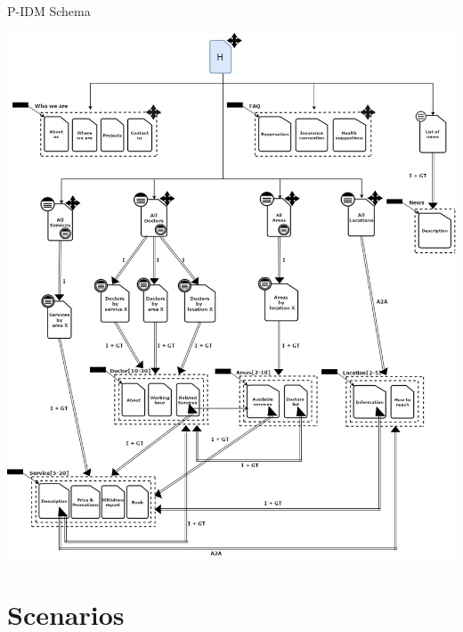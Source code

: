 \documentclass{../Common/Structure/doc_pdf}
\begin{document}
\newpage

{\centering 
P-IDM Schema
\vspace{1cm}
\begin{center}
	\includegraphics[width=\textwidth]{Clinic_P_IDM.jpg}
\end{center}}


\chapter{Scenarios}
\thispagestyle{fancy}
\end{document}
